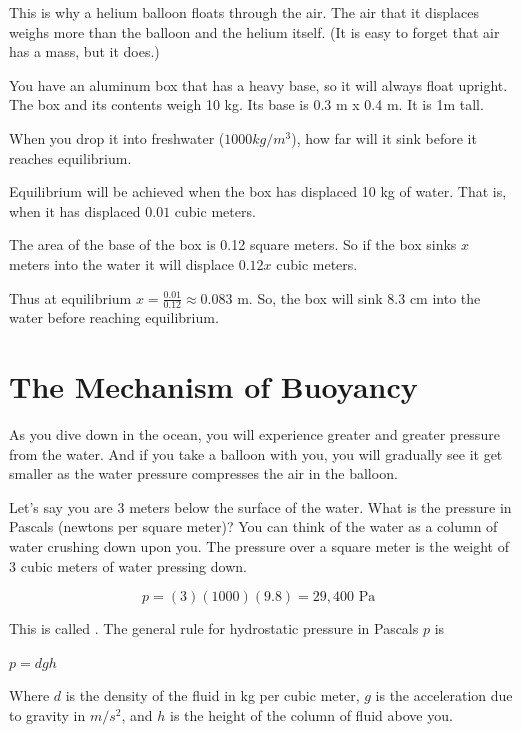 This is why a helium balloon floats through the air. The air
that it displaces weighs more than the balloon and the helium itself. (It is easy to forget that air has a mass, but it does.)

\begin{Exercise}[title={Buoyancy}, label=buoyancy]
  You have an aluminum box that has a heavy base, so it will always
  float upright. The box and its contents weigh 10 kg. Its base is 0.3 m x 0.4 m. It is 1m tall.

  When you drop it into freshwater ($1000 kg/m^3$), how far will it sink
  before it reaches equilibrium.
  
\end{Exercise}
\begin{Answer}[ref=buoyancy]
  Equilibrium will be achieved when the box has displaced 10 kg of water. That is, when it has displaced $0.01$ cubic meters.

  The area of the base of the box is 0.12 square meters.  So if the
  box sinks $x$ meters into the water it will displace $0.12 x$ cubic
  meters.

  Thus at equilibrium $x = \frac{0.01}{0.12} \approx 0.083$ m.  So,
  the box will sink 8.3 cm into the water before reaching equilibrium.
\end{Answer}

\section{The Mechanism of Buoyancy}

As you dive down in the ocean, you will experience greater and
greater pressure from the water. And if you take a balloon with you, you
will gradually see it get smaller as the water pressure compresses the
air in the balloon.

Let's say you are 3 meters below the surface of the water. What is the
pressure in Pascals (newtons per square meter)? You can think of the
water as a column of water crushing down upon you. The pressure over
a square meter is the weight of 3 cubic meters of water pressing down.

$$p = (3)(1000)(9.8) = 29,400 \text{ Pa }$$

This is called . The general rule for
hydrostatic pressure in Pascals $p$ is

$p = d g h$

Where  $d$ is the density of the fluid
in kg per cubic meter, $g$ is the acceleration due to gravity in
$m/s^2$, and $h$ is the height of the column of fluid above you.

